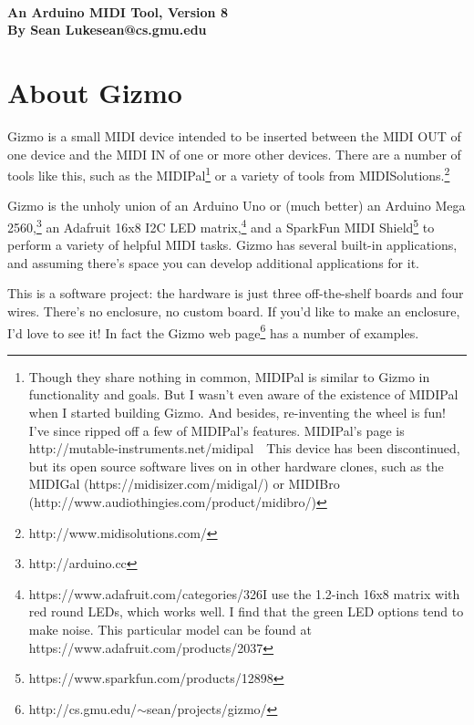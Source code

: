 \documentclass{article}
\begin{document}
\\[0.5em]
{\large \bf An Arduino MIDI Tool, Version 8\\
By Sean Luke\quad sean@cs.gmu.edu} 
\\

\vspace{-1em}
\setcounter{tocdepth}{2}
\tableofcontents
\clearpage

\section{About Gizmo}

\noindent Gizmo is a small MIDI device intended to be inserted between the MIDI OUT of one device and the MIDI IN of one or more other devices.  There are a number of tools like this, such as the MIDIPal\footnote{Though they share nothing in common, MIDIPal is similar to Gizmo in functionality and goals.  But I wasn't even aware of the existence of MIDIPal when I started building Gizmo.  And besides, re-inventing the wheel is fun!  I've since ripped off a few of MIDIPal's features.  MIDIPal's page is http:/\!/mutable-instruments.net/midipal\ \ This device has been discontinued, but its open source software lives on in other hardware clones, such as the MIDIGal (https:/\!/midisizer.com/midigal/) or MIDIBro (http:/\!/www.audiothingies.com/product/midibro/)} or a variety of tools from MIDISolutions.\footnote{http:/\!/www.midisolutions.com/}

Gizmo is the unholy union of an Arduino Uno or (much better) an Arduino Mega 2560,\footnote{http:/\!/arduino.cc} an Adafruit 16x8 I2C LED matrix,\footnote{https:/\!/www.adafruit.com/categories/326\quad I use the 1.2-inch 16x8 matrix with red round LEDs, which works well.    I find that the green LED options tend to make noise.  This particular model can be found at https:/\!/www.adafruit.com/products/2037} and a SparkFun MIDI Shield\footnote{https:/\!/www.sparkfun.com/products/12898} to perform a variety of helpful MIDI tasks.  Gizmo has several built-in applications, and assuming there's space you can develop additional applications for it.

This is a software project: the hardware is just three off-the-shelf boards and four wires.  There's no enclosure, no custom board.  If you'd like to make an enclosure, I'd love to see it!  In fact the Gizmo web page\footnote{http:/\!/cs.gmu.edu/\(\sim\)sean/projects/gizmo/} has a number of examples.
\end{document}
